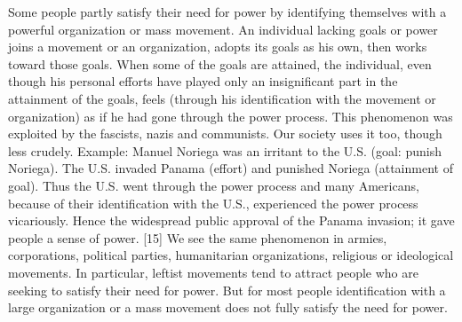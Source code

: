 Some people partly satisfy their need for power by identifying themselves with a powerful organization or mass movement. An individual lacking goals or power joins a movement or an organization, adopts its goals as his own, then works toward those goals. When some of the goals are attained, the individual, even though his personal efforts have played only an insignificant part in the attainment of the goals, feels (through his identification with the movement or organization) as if he had gone through the power process. This phenomenon was exploited by the fascists, nazis and communists. Our society uses it too, though less crudely. Example: Manuel Noriega was an irritant to the U.S. (goal: punish Noriega). The U.S. invaded Panama (effort) and punished Noriega (attainment of goal). Thus the U.S. went through the power process and many Americans, because of their identification with the U.S., experienced the power process vicariously. Hence the widespread public approval of the Panama invasion; it gave people a sense of power. [15] We see the same phenomenon in armies, corporations, political parties, humanitarian organizations, religious or ideological movements. In particular, leftist movements tend to attract people who are seeking to satisfy their need for power. But for most people identification with a large organization or a mass movement does not fully satisfy the need for power.

